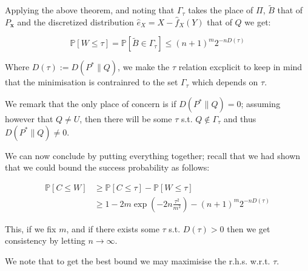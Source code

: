 Applying the above theorem, and noting that $\Gamma_\tau$ takes the place of $\Pi$, $\tilde{B}$ that of $P_{\mathbf{x}}$
and the discretized distribution $\hat{e}_X = X - \hat{f}_X(Y)$ that of $Q$ we get:

\begin{equation}
    \mathbb{P}\left[W \leq \tau \right] = \mathbb{P}\left[ \tilde{B} \in \Gamma_\tau \right] 
    \leq (n+1)^{m} 2^{-nD\left( \tau \right)}
\end{equation}

Where $D\left( \tau \right) := D\left(P^{*} \| Q\right)$, we make the $\tau$ relation excplicit to 
keep in mind that the minimisation is contrainred to the set $\Gamma_\tau$ which depends on $\tau$.

We remark that the only place of concern is if $D\left(P^{*} \| Q\right) = 0$; assuming however that $Q \neq U$, then 
there will be some $\tau$ s.t. $Q \notin \Gamma_\tau$ and thus $D\left(P^{*} \| Q\right) \neq 0$.

We can now conclude by putting everything together; recall that we had shown that we could bound the success probability 
as follows:



\begin{align}
    \mathbb{P}\left[C \leq W\right] &\geq \mathbb{P}\left[C \leq \tau \right] - \mathbb{P}\left[W \leq \tau \right] \\
    &\geq 1 - 2m\exp \left( -2n \frac{\tau^2}{m^2} \right) - (n+1)^{m} 2^{-nD\left( \tau \right)}
\end{align}

This, if we fix $m$, and if there exists some $\tau$ s.t. $D\left( \tau \right) > 0$ then we get consistency
by letting $n \rightarrow \infty$.

We note that to get the best bound we may maximisise the r.h.s. w.r.t. $\tau$.